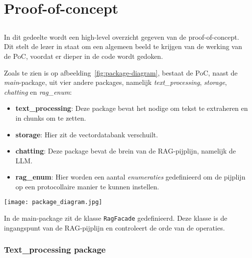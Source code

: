 \chapter{Proof-of-concept}%
\label{ch:proof-of-concept}

\section{}%
\label{sec:poc-structure}

In dit gedeelte wordt een high-level overzicht gegeven van de proof-of-concept. Dit stelt de lezer in staat om een algemeen beeld te krijgen van de werking van de PoC, voordat er dieper in de code wordt gedoken.

Zoals te zien is op afbeelding~\ref{fig:package-diagram}, bestaat de PoC, naast de \textit{main}-package, uit vier andere packages, namelijk \textit{text\_processing}, \textit{storage}, \textit{chatting} en \textit{rag\_enum}:

\begin{itemize}
    \item \textbf{text\_processing}: Deze package bevat het nodige om tekst te extraheren en in chunks om te zetten.
    \item \textbf{storage}: Hier zit de vectordatabank verschuilt.
    \item \textbf{chatting}: Deze package bevat de brein van de RAG-pijplijn, namelijk de \acrshort{LLM}. 
    \item \textbf{rag\_enum}: Hier worden een aantal \emph{enumeraties} gedefinieerd om de pijplijn op een protocollaire manier te kunnen instellen.
\end{itemize} 

\begin{sidewaysfigure}
    \centering
    \texttt{[image: package\_diagram.jpg]}
    \caption[Package-structuur]{\label{fig:package-diagram}Package-structuur van de proof-of-concept. De \textit{main}-package vormt het startpunt van de applicatie en importeert alle componenten die zich in de overige packages bevinden}
\end{sidewaysfigure}

In de main-package zit de klasse \texttt{RagFacade} gedefinieerd. Deze klasse is de ingangspunt van de RAG-pijplijn en controleert de orde van de operaties. 

\subsection{Text\_processing package}%
\label{subsec:pckg-text_processing}

